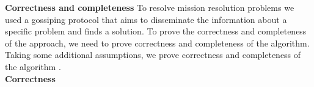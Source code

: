 \documentclass[journal]{IEEEtran}
\theoremstyle{definition}
\newcommand\patrizio[1]{\nb{Patrizio}{#1}}
\begin{document}



\textbf{Correctness and completeness}
To resolve mission resolution problems we used a gossiping protocol that aims to disseminate the information about a specific problem and finds a solution. To prove the correctness and completeness of the approach, we need to prove correctness and completeness of the algorithm. 
Taking some additional assumptions, we prove correctness and completeness of the algorithm .\\
\textbf{Correctness} 
\end{document}
